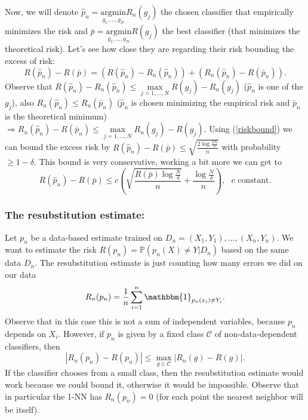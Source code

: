 \documentclass[11pt, english]{article}
\begin{document}
Now, we will denote $\hat{p}_n=\underset{g_1,\dots,g_N}{\text{argmin}}R_n(g_j)$ the chosen classifier that empirically minimizes the risk and $\bar{p}=\underset{g_1,\dots,g_N}{\text{argmin}}R(g_j)$ the best classifier (that minimizes the theoretical risk). Let's see how close they are regarding their risk bounding the excess of risk:
\begin{equation}
	R(\hat{p}_n)-R(\bar{p})=(R(\hat{p}_n)-R_n(\hat{p}_n))+(R_n(\hat{p}_n)-R(\bar{p}_n)).
\end{equation}
Observe that $R(\hat{p}_n)-R_n(\hat{p}_n)\leq\underset{j=1,\dots,N}{\max}R(g_j)-R_n(g_j)$ ($\hat{p}_n$ is one of the $g_j$), also $R_n(\hat{p}_n)\leq R_n(\bar{p}_n)$ ($\hat{p}_n$ is chosen minimizing the empirical risk and $\bar{p}_n$ is the theoretical minimum) $\Rightarrow R_n(\hat{p}_n)-R(\bar{p}_n)\leq \underset{j=1,\dots,N}{\max}R_n(g_j)-R(g_j)$. Using (\ref{riskbound}) we can bound the excess risk by $R(\hat{p}_n)-R(\bar{p})\leq \sqrt{\frac{2\log\frac{2N}{\delta}}{n}}$ with probability $\geq 1-\delta$. This bound is very conservative, working a bit more we can get to
\begin{equation}
	R(\hat{p}_n)-R(\bar{p})\leq c\left(\sqrt{\frac{R(\bar{p})\log\frac{N}{\delta}}{n}}+\frac{\log\frac{N}{\delta}}{n}\right), \text{ }c \text{ constant}.
\end{equation}
\subsubsection{The resubstitution estimate:}

Let $p_n$ be a data-based estimate trained on $D_n=(X_1,Y_1),\dots,(X_n,Y_n)$. We want to estimate the risk $R(p_n)=\mathbb{P}(p_n(X)\neq Y|D_n)$ based on the same data $D_n$. The resubstitution estimate is just counting how many errors we did on our data
\begin{equation}
	R_n(p_n)=\frac{1}{n}\sum\limits_{i=1}^n\mathbbm{1}_{p_n(x_i)\neq Y_i}.
\end{equation}
Observe that in this case this is not a sum of independent variables, because $p_n$ depends on $X_i$. However, if $p_n$ is given by a fixed class $\mathcal{C}$ of non-data-dependent classifiers, then 
\begin{equation}
	|R_n(p_n)-R(p_n)|\leq\underset{g\in\mathcal{C}}{\max}|R_n(g)-R(g)|.
\end{equation}
If the classifier chooses from a small class, then the resubstitution estimate would work because we could bound it, otherwise it would be impossible. Observe that in particular the 1-NN has $R_n(p_n)=0$ (for each point the nearest neighbor will be itself).
\end{document}
